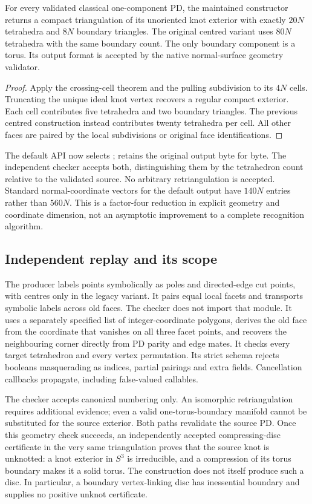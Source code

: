 \begin{proposition}
For every validated classical one-component PD, the maintained constructor
returns a compact triangulation of its unoriented knot exterior with exactly
$20N$ tetrahedra and $8N$ boundary triangles. The original centred variant
uses $80N$ tetrahedra with the same boundary count. The only boundary component
is a torus. Its output format is accepted by the native normal-surface geometry
validator.
\end{proposition}
\begin{proof}
Apply the crossing-cell theorem and the pulling subdivision to its $4N$
cells. Truncating the unique ideal knot vertex recovers a regular compact
exterior. Each cell contributes five tetrahedra and two boundary triangles.
The previous centred construction instead contributes twenty tetrahedra
per cell. All other faces are paired by the local subdivisions or original
face identifications.
\end{proof}

The default API now selects ; 
retains the original output byte for byte. The independent checker accepts
both, distinguishing them by the tetrahedron count relative to the validated
source. No arbitrary retriangulation is accepted. Standard normal-coordinate
vectors for the default output have $140N$ entries rather than $560N$.
This is a factor-four reduction in explicit geometry and coordinate dimension,
not an asymptotic improvement to a complete recognition algorithm.

\subsection{Independent replay and its scope}

The producer labels points symbolically as poles and directed-edge cut points,
with centres only in the legacy variant. It pairs equal local facets and
transports symbolic labels across old faces. The checker does not import that module.
It uses a separately specified list of integer-coordinate polygons, derives
the old face from the coordinate that vanishes on all three facet points,
and recovers the neighbouring corner directly from PD parity and edge mates.
It checks every target tetrahedron and every vertex permutation. Its strict
schema rejects booleans masquerading as indices, partial pairings and extra
fields. Cancellation callbacks propagate, including false-valued callables.

The checker accepts canonical numbering only. An isomorphic retriangulation
requires additional evidence; even a valid one-torus-boundary manifold cannot
be substituted for the source exterior. Both paths revalidate the source PD.
Once this geometry check succeeds, an independently accepted compressing-disc
certificate in the very same triangulation proves that the source knot is
unknotted: a knot exterior in $S^3$ is irreducible, and a compression of its
torus boundary makes it a solid torus. The construction does not itself
produce such a disc. In particular, a boundary vertex-linking disc has
inessential boundary and supplies no positive unknot certificate.

